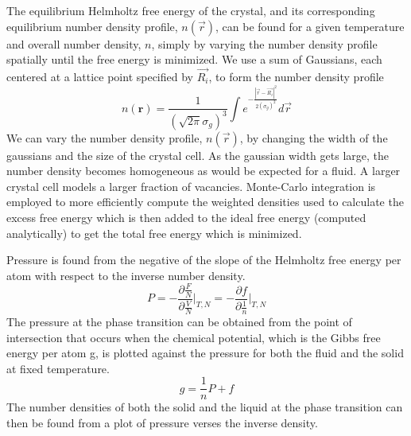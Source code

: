 \documentclass[letterpaper,twocolumn,amsmath,amssymb,prb]{revtex4-1}
\begin{document}
The equilibrium Helmholtz free energy of the crystal, and its corresponding 
equilibrium number density profile, $n(\vec{r})$, can be found for a given 
temperature and overall number density, $n$, simply by varying the number density profile spatially 
until the free energy
is minimized. 
We use a sum of 
Gaussians, each centered at a lattice point specified by $\vec{R_i}$, to form 
the number density profile 
\begin{equation}n(\textbf{r})= \frac{1}{\left(\sqrt{2\pi}\sigma_{g}\right)^3}
\int{e^{-\frac{|\vec{r}-\vec{R_i}|^2}{2\left(\sigma_g\right)^2}}d{\vec{r}}}  \end{equation}  
We can vary the number density profile, $n(\vec{r})$, by changing the width of the gaussians
and the size of the crystal cell. \color{black}As the gaussian width gets large, the number 
density becomes homogeneous as would be expected for a fluid. A larger crystal cell models a larger fraction 
of vacancies. Monte-Carlo integration is employed to more efficiently 
compute the weighted densities used to calculate the excess free energy which is then 
added to the ideal free energy (computed analytically) to get the total free energy 
which is minimized. 

Pressure is found from the negative of the slope of the Helmholtz 
free energy per atom with respect to the inverse number density. 
\begin{equation}{P=-\frac{\partial{\frac{F}{N}}}{\partial{\frac{V}{N}}}\bigg|_{T,N} 
= -\frac{\partial{f}}{\partial{\frac{1}{n}}}\bigg|_{T,N}}\end{equation} 
The pressure at the phase transition can be obtained from the point of intersection
that occurs when the chemical potential, which is the Gibbs free energy per atom g,
is plotted against the pressure for both the fluid and the solid at fixed temperature. 
\begin{equation}{g = \frac{1}{n}P + f}\end{equation}
The number densities of both the solid and the liquid at the phase transition can then
be found from a plot of pressure verses the inverse density. 
\end{document}
